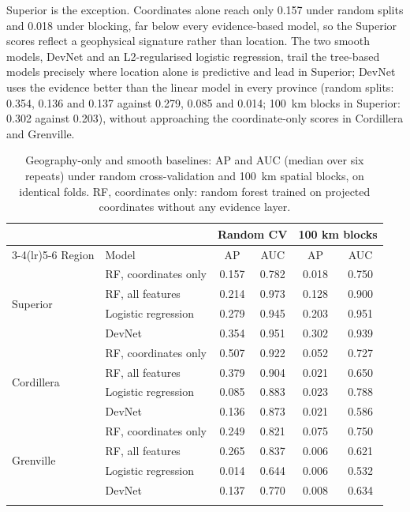 \documentclass[pdflatex,sn-apa]{sn-jnl}
\begin{document}
Superior is the exception. Coordinates alone reach only 0.157 under random splits and 0.018 under blocking, far below every evidence-based model, so the Superior scores reflect a geophysical signature rather than location. The two smooth models, DevNet and an L2-regularised logistic regression, trail the tree-based models precisely where location alone is predictive and lead in Superior; DevNet uses the evidence better than the linear model in every province (random splits: 0.354, 0.136 and 0.137 against 0.279, 0.085 and 0.014; 100~km blocks in Superior: 0.302 against 0.203), without approaching the coordinate-only scores in Cordillera and Grenville.

\begin{table}[t]
\caption{Geography-only and smooth baselines: AP and AUC (median over six repeats) under random cross-validation and 100~km spatial blocks, on identical folds. RF, coordinates only: random forest trained on projected coordinates without any evidence layer.}\label{tab:geography}
\footnotesize
\setlength{\tabcolsep}{3pt}
\begin{tabular*}{\textwidth}{@{\extracolsep\fill}llcccc}
\toprule
 & & \multicolumn{2}{c}{Random CV} & \multicolumn{2}{c}{100 km blocks} \\
\cmidrule(lr){3-4}\cmidrule(lr){5-6}
Region & Model & AP & AUC & AP & AUC \\
\midrule
\multirow{4}{*}{Superior} & RF, coordinates only & 0.157 & 0.782 & 0.018 & 0.750 \\
 & RF, all features & 0.214 & 0.973 & 0.128 & 0.900 \\
 & Logistic regression & 0.279 & 0.945 & 0.203 & 0.951 \\
 & DevNet & 0.354 & 0.951 & 0.302 & 0.939 \\
\midrule
\multirow{4}{*}{Cordillera} & RF, coordinates only & 0.507 & 0.922 & 0.052 & 0.727 \\
 & RF, all features & 0.379 & 0.904 & 0.021 & 0.650 \\
 & Logistic regression & 0.085 & 0.883 & 0.023 & 0.788 \\
 & DevNet & 0.136 & 0.873 & 0.021 & 0.586 \\
\midrule
\multirow{4}{*}{Grenville} & RF, coordinates only & 0.249 & 0.821 & 0.075 & 0.750 \\
 & RF, all features & 0.265 & 0.837 & 0.006 & 0.621 \\
 & Logistic regression & 0.014 & 0.644 & 0.006 & 0.532 \\
 & DevNet & 0.137 & 0.770 & 0.008 & 0.634 \\
\botrule
\end{tabular*}
\end{table}
\end{document}
